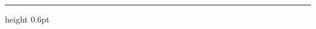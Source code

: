 \begin{titlepage}
\begin{center}
\begin{minipage}{0.82\textwidth}
        \vspace{0.45cm}
        {\color{dividerline}\hrule height 0.6pt}
    \end{minipage}
    
    \vfill
    
    {\fontsize{11pt}{14pt}\selectfont \submissiondate \par}
    \vspace*{0.2cm}
\end{center}

\end{titlepage}